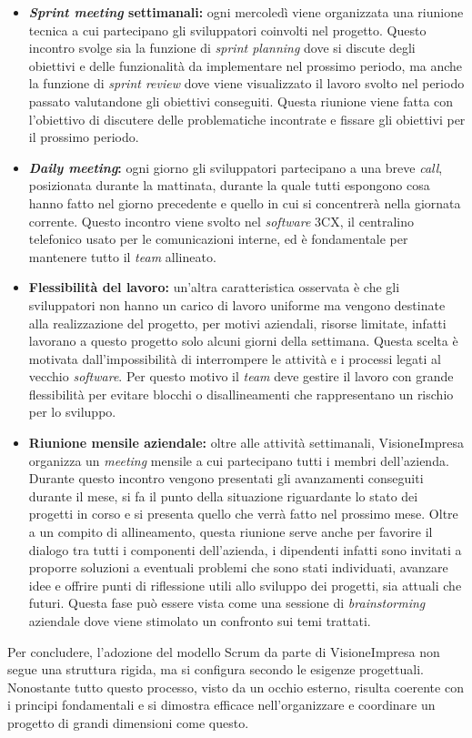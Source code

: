\begin{itemize}
    \item \textbf{\textit{Sprint meeting} settimanali:}
    ogni mercoledì viene organizzata una riunione tecnica a cui partecipano gli sviluppatori coinvolti nel progetto. Questo incontro svolge sia la funzione di \textit{sprint planning} dove si discute degli obiettivi e delle funzionalità da implementare nel prossimo periodo, ma anche la funzione di \textit{sprint review} dove viene visualizzato il lavoro svolto nel periodo passato valutandone gli obiettivi conseguiti. Questa riunione viene fatta con l'obiettivo di discutere delle problematiche incontrate e fissare gli obiettivi per il prossimo periodo.
    \item \textbf{\textit{Daily meeting}:}
    ogni giorno gli sviluppatori partecipano a una breve \textit{call}, posizionata durante la mattinata, durante la quale tutti espongono cosa hanno fatto nel giorno precedente e quello in cui si concentrerà nella giornata corrente. Questo incontro viene svolto nel \textit{software} 3CX, il centralino telefonico usato per le comunicazioni interne, ed è fondamentale per mantenere tutto il \textit{team} allineato.
    \item \textbf{Flessibilità del lavoro:} 
    un'altra caratteristica osservata è che gli sviluppatori non hanno un carico di lavoro uniforme ma vengono destinate alla realizzazione del progetto, per motivi aziendali, risorse limitate, infatti lavorano a questo progetto solo alcuni giorni della settimana. Questa scelta è motivata dall'impossibilità di interrompere le attività e i processi legati al vecchio \textit{software}. Per questo motivo il \textit{team} deve gestire il lavoro con grande flessibilità per evitare blocchi o disallineamenti che rappresentano un rischio per lo sviluppo.
    \item  \textbf{Riunione mensile aziendale:}
    oltre alle attività settimanali, VisioneImpresa organizza un \textit{meeting} mensile a cui partecipano tutti i membri dell'azienda. Durante questo incontro vengono presentati gli avanzamenti conseguiti durante il mese, si fa il punto della situazione riguardante lo stato dei progetti in corso e si presenta quello che verrà fatto nel prossimo mese. Oltre a un compito di allineamento, questa riunione serve anche per favorire il dialogo tra tutti i componenti dell'azienda, i dipendenti infatti sono invitati a proporre soluzioni a eventuali problemi che sono stati individuati, avanzare idee e offrire punti di riflessione utili allo sviluppo dei progetti, sia attuali che futuri. Questa fase può essere vista come una sessione di \textit{brainstorming} aziendale dove viene stimolato un confronto sui temi trattati.
\end{itemize}
Per concludere, l'adozione del modello Scrum da parte di VisioneImpresa non segue una struttura rigida, ma si configura secondo le esigenze progettuali. Nonostante tutto questo processo, visto da un occhio esterno, risulta coerente con i principi fondamentali e si dimostra efficace nell'organizzare e coordinare un progetto di grandi dimensioni come questo.


